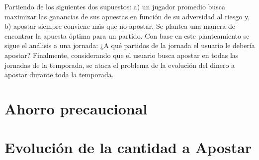 
Partiendo de los siguientes dos supuestos: a) un jugador promedio busca maximizar las ganancias de sus apuestas en función de su adversidad al riesgo y, b) apostar siempre conviene más que no apostar. Se plantea una manera de encontrar la apuesta óptima para un partido. Con base en este planteamiento se sigue el análisis a una jornada: ¿A qué partidos de la jornada el usuario le debería apostar? Finalmente, considerando que el usuario busca apostar en todas las jornadas de la temporada, se ataca el problema de la evolución del dinero a apostar durante toda la temporada.


\section{Ahorro precaucional}



\section{Evolución de la cantidad a Apostar}

